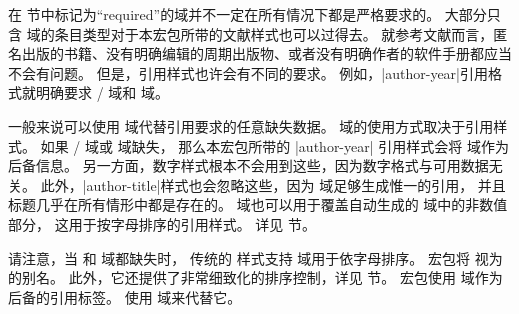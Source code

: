 在  节中标记为“required”的域并不一定在所有情况下都是严格要求的。
大部分只含  域的条目类型对于本宏包所带的文献样式也可以过得去。
就参考文献而言，匿名出版的书籍、没有明确编辑的周期出版物、或者没有明确作者的软件手册都应当不会有问题。
但是，引用样式也许会有不同的要求。
例如，|author-year|引用格式就明确要求 \slash {} 域和  域。


一般来说可以使用  域代替引用要求的任意缺失数据。
 域的使用方式取决于引用样式。
如果 \slash {} 域或  域缺失，
那么本宏包所带的 |author-year| 引用样式会将  域作为后备信息。
另一方面，数字样式根本不会用到这些，因为数字格式与可用数据无关。
此外，|author-title|样式也会忽略这些，因为  域足够生成惟一的引用，
并且标题几乎在所有情形中都是存在的。
 域也可以用于覆盖自动生成的  域中的非数值部分，
这用于按字母排序的引用样式。
详见  节。



请注意，当  和  域都缺失时，
传统的 \BibTeX 样式支持  域用于依字母排序。
\biblatex 宏包将  视为  的别名。
此外，它还提供了非常细致化的排序控制，详见  节。
 宏包使用  域作为后备的引用标签。
使用  域来代替它。

